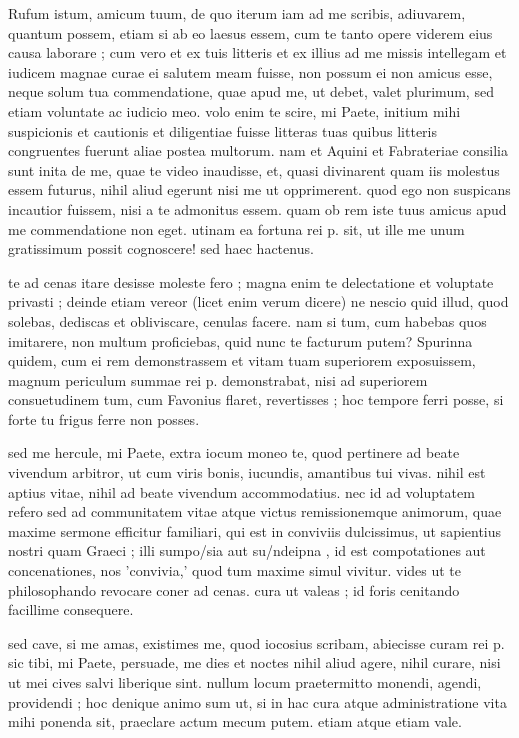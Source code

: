 


 Rufum istum, amicum tuum, de quo iterum iam ad me scribis, adiuvarem, quantum possem, etiam si ab eo laesus essem, cum te tanto opere viderem eius causa laborare ; cum vero et ex tuis litteris et ex illius ad me missis intellegam et iudicem magnae curae ei salutem meam fuisse, non possum ei non amicus esse, neque solum tua commendatione, quae apud me, ut debet, valet plurimum, sed etiam voluntate ac iudicio meo. volo enim te scire, mi Paete, initium mihi suspicionis et cautionis et diligentiae fuisse litteras tuas quibus litteris congruentes fuerunt aliae postea multorum. nam et Aquini et Fabrateriae consilia sunt inita de me, quae te video inaudisse, et, quasi divinarent quam iis molestus essem futurus, nihil aliud egerunt nisi me ut opprimerent. quod ego non suspicans incautior fuissem, nisi a te admonitus essem. quam ob rem iste tuus amicus apud me commendatione non eget. utinam ea fortuna rei p. sit, ut ille me unum gratissimum possit cognoscere! sed haec hactenus.

 te ad cenas itare desisse moleste fero ; magna enim te delectatione et voluptate privasti ; deinde etiam vereor (licet enim verum dicere) ne nescio quid illud, quod solebas, dediscas et obliviscare, cenulas facere. nam si tum, cum habebas quos imitarere, non multum proficiebas, quid nunc te facturum putem? Spurinna quidem, cum ei rem demonstrassem et vitam tuam superiorem exposuissem, magnum periculum summae rei p. demonstrabat, nisi ad superiorem consuetudinem tum, cum Favonius flaret, revertisses ; hoc tempore ferri posse, si forte tu frigus ferre non posses.

 sed me hercule, mi Paete, extra iocum moneo te, quod pertinere ad beate vivendum arbitror, ut cum viris bonis, iucundis, amantibus tui vivas. nihil est aptius vitae, nihil ad beate vivendum accommodatius. nec id ad voluptatem refero sed ad communitatem vitae atque victus remissionemque animorum, quae maxime sermone efficitur familiari, qui est in conviviis dulcissimus, ut sapientius nostri quam Graeci ; illi sumpo/sia aut su/ndeipna , id est compotationes aut concenationes, nos 'convivia,' quod tum maxime simul vivitur. vides ut te philosophando revocare coner ad cenas. cura ut valeas ; id foris cenitando facillime consequere.

 sed cave, si me amas, existimes me, quod iocosius scribam, abiecisse curam rei p. sic tibi, mi Paete, persuade, me dies et noctes nihil aliud agere, nihil curare, nisi ut mei cives salvi liberique sint. nullum locum praetermitto monendi, agendi, providendi ; hoc denique animo sum ut, si in hac cura atque administratione vita mihi ponenda sit, praeclare actum mecum putem. etiam atque etiam vale.
